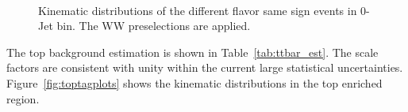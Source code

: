 \begin{figure}[!hbtp]
{}
\\

\caption{Kinematic distributions of the different flavor same sign events in 0-Jet bin. 
The WW preselections are applied.}
\label{fig:ssplots}
\end{figure}

The top background estimation is shown in Table~\ref{tab:ttbar_est}. 
The scale factors are consistent with unity within 
the current large statistical uncertainties. 
Figure~\ref{fig:toptagplots} shows the kinematic distributions in the top enriched 
region. 

